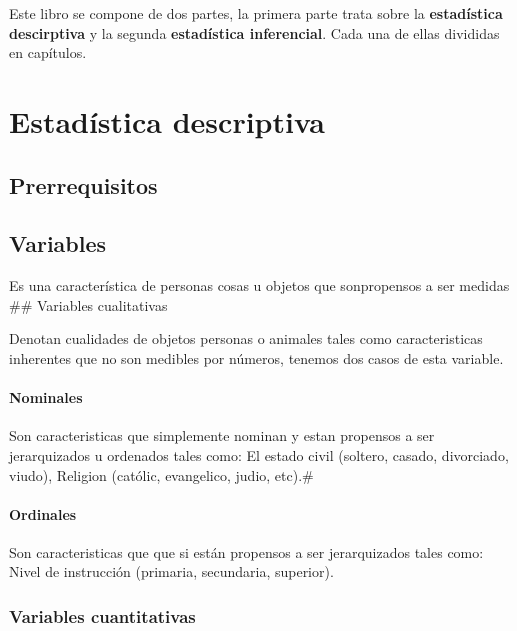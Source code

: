 \documentclass[10pt,]{krantz}
\theoremstyle{definition}
\theoremstyle{definition}
\theoremstyle{definition}
\theoremstyle{remark}
\begin{document}
Este libro se compone de dos partes, la primera parte trata sobre la \textbf{estadística descirptiva} y la segunda \textbf{estadística inferencial}. Cada una de ellas divididas en capítulos.

\mainmatter

\hypertarget{part-estaduxedstica-descriptiva}{%
\part{Estadística descriptiva}\label{part-estaduxedstica-descriptiva}}

\hypertarget{prerrequisitos}{%
\chapter{Prerrequisitos}\label{prerrequisitos}}

\hypertarget{variables}{%
\chapter{Variables}\label{variables}}

Es una característica de personas cosas u objetos que sonpropensos a ser medidas
\#\# Variables cualitativas

Denotan cualidades de objetos personas o animales tales como caracteristicas inherentes que no son medibles por números, tenemos dos casos de esta variable.

\hypertarget{nominales}{%
\subsection{Nominales}\label{nominales}}

Son caracteristicas que simplemente nominan y estan propensos a ser jerarquizados u ordenados tales como: El estado civil (soltero, casado, divorciado, viudo), Religion (católic, evangelico, judio, etc).\#

\hypertarget{ordinales}{%
\subsection{Ordinales}\label{ordinales}}

Son caracteristicas que que si están propensos a ser jerarquizados tales como: Nivel de instrucción (primaria, secundaria, superior).

\hypertarget{variables-cuantitativas}{%
\section{Variables cuantitativas}\label{variables-cuantitativas}}
\end{document}
